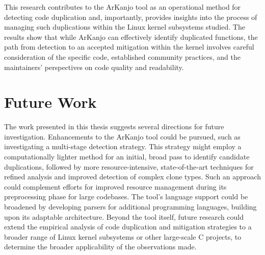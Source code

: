 This research contributes to the ArKanjo tool as an operational method for detecting code 
duplication and, importantly, provides insights into the process of managing such duplications 
within the Linux kernel subsystems studied. The results show that while ArKanjo can effectively 
identify duplicated functions, the path from detection to an accepted mitigation within the kernel 
involves careful consideration of the specific code, established community practices, and the 
maintainers' perspectives on code quality and readability.

\section{Future Work}

The work presented in this thesis suggests several directions for future investigation. Enhancements 
to the ArKanjo tool could be pursued, such as investigating a multi-stage detection strategy. 
This strategy might employ a computationally lighter method for an initial, broad pass to identify 
candidate duplications, followed by more resource-intensive, state-of-the-art techniques for refined 
analysis and improved detection of complex clone types. Such an approach could complement efforts for 
improved resource management during its preprocessing phase for large codebases. The tool's language 
support could be broadened by developing parsers for additional programming languages, building upon 
its adaptable architecture. Beyond the tool itself, future research could extend the empirical analysis 
of code duplication and mitigation strategies to a broader range of Linux kernel subsystems or other 
large-scale C projects, to determine the broader applicability of the observations made.
